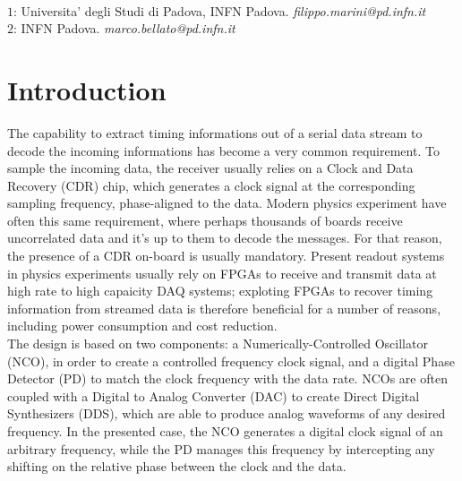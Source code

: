 \documentclass[11pt]{article}
\renewcommand{\>}{\rangle} \renewcommand{\emptyset}{\varnothing}
\begin{document}
\textit{ }\\
$1$: Universita' degli Studi di Padova, INFN Padova. \textit{filippo.marini@pd.infn.it}\\
$2$: INFN Padova. \textit{marco.bellato@pd.infn.it}\\
\newpage

\tableofcontents

\newpage
\section{Introduction}
The capability to extract timing informations out of a serial data stream to
decode the incoming informations has become a very common requirement. To sample
the incoming data, the receiver usually relies on a Clock and Data Recovery
(CDR) chip, which generates a clock signal at the corresponding sampling
frequency, phase-aligned to the data. Modern physics experiment have often this
same requirement, where perhaps thousands of boards receive uncorrelated data
and it's up to them to decode the messages. For that reason, the presence of a
CDR on-board is usually mandatory. Present readout systems in physics
experiments usually rely on FPGAs to receive and transmit data at high rate to
high capaicity DAQ systems; exploting FPGAs to recover timing information from
streamed data is therefore beneficial for a number of reasons, including power
consumption and cost reduction. \\
The design is based on two components: a Numerically-Controlled Oscillator
(NCO), in order to create a controlled frequency clock signal, and a digital
Phase Detector (PD) to match the clock frequency with the data rate. NCOs are
often coupled with a Digital to Analog Converter (DAC) to create Direct Digital
Synthesizers (DDS), which are able to produce analog waveforms of any desired
frequency. In the presented case, the NCO generates a digital clock signal of an
arbitrary frequency, while the PD manages this frequency by intercepting any
shifting on the relative phase between the clock and the data.
\end{document}
